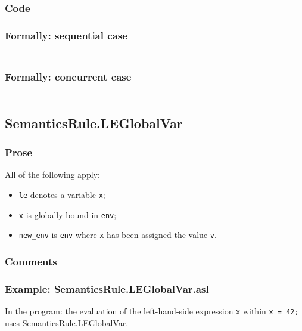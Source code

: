 \documentclass{book}
\begin{document}
  \subsubsection{Code}

  \subsubsection{Formally: sequential case}
  \begin{align}
  \end{align} 

  \subsubsection{Formally: concurrent case}
  \begin{align}
  \end{align} 

\subsection{SemanticsRule.LEGlobalVar \label{sec:SemanticsRule.LEGlobalVar}}

    \subsubsection{Prose}
    All of the following apply:
    \begin{itemize}
    \item \texttt{le} denotes a variable \texttt{x};
    \item \texttt{x} is globally bound in \texttt{env};
    \item \texttt{new\_env} is \texttt{env} where \texttt{x} has been assigned the value \texttt{v}.
    \end{itemize}

    \subsubsection{Comments}

    \subsubsection{Example: SemanticsRule.LEGlobalVar.asl}
    In the program:
    the evaluation of the left-hand-side expression \texttt{x} within \texttt{x = 42;} uses SemanticsRule.LEGlobalVar.
\end{document}
